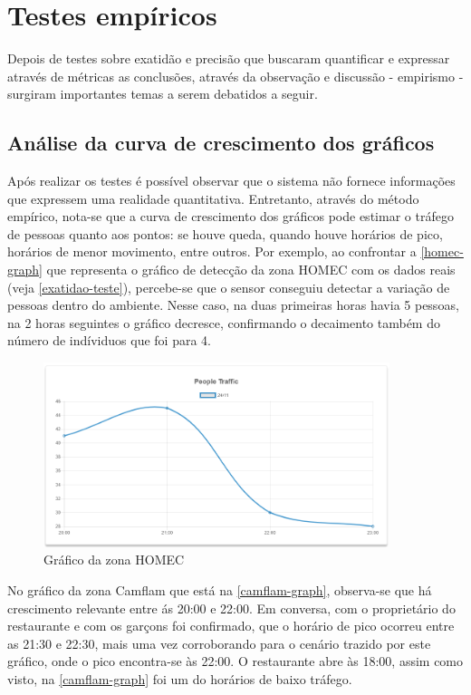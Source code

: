 \section{Testes empíricos}
Depois de testes sobre exatidão e precisão que buscaram quantificar e expressar através de métricas
as conclusões, através da observação e discussão - empirismo - surgiram importantes temas a serem debatidos
a seguir.

\subsection{Análise da curva de crescimento dos gráficos}
Após realizar os testes é possível observar que o sistema não fornece informações
que expressem uma realidade quantitativa. Entretanto, através do método
empírico, nota-se que a curva de crescimento dos gráficos pode estimar o tráfego
de pessoas quanto aos pontos: se houve queda, quando houve horários de pico,
horários de menor movimento, entre outros. Por exemplo, ao confrontar a \autoref{homec-graph} que representa
o gráfico de detecção da zona HOMEC com os dados reais (veja \autoref{exatidao-teste}), percebe-se que
o sensor conseguiu detectar a variação de pessoas dentro do ambiente. Nesse caso, na duas primeiras horas havia 5 pessoas, na 2 horas
seguintes o gráfico decresce, confirmando o decaimento também do número de indíviduos que foi para 4.

\begin{figure}[!h]
  \caption{\label{homec-graph}Gráfico da zona HOMEC}
  \begin{center}
    \includegraphics[width=0.90\textwidth]{img/graph-homec.png}
  \end{center}
\end{figure}

No gráfico da zona Camflam que está na \autoref{camflam-graph}, observa-se que
há crescimento relevante entre ás 20:00 e 22:00. Em conversa, com o proprietário
do restaurante e com os garçons foi confirmado, que o horário de pico ocorreu
entre as 21:30 e 22:30, mais uma vez corroborando para o cenário trazido por este
gráfico, onde o pico encontra-se às 22:00. O restaurante abre às 18:00, assim como visto,
na \autoref{camflam-graph} foi um do horários de baixo tráfego.


